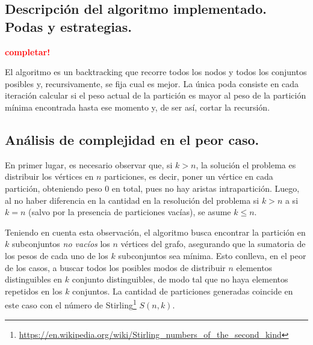 \subsection{Descripción del algoritmo implementado. Podas y estrategias.}
\vspace*{0.3cm}

\textcolor{red}{\textbf{completar!}}

El algoritmo es un backtracking que recorre todos los nodos y todos los
conjuntos posibles y, recursivamente, se fija cual es mejor.  La única poda
consiste en cada iteración calcular si el peso actual de la partición es mayor
al peso de la partición mínima encontrada hasta ese momento y, de ser así,
cortar la recursión.


\newpage

\subsection{Análisis de complejidad en el peor caso.}
\vspace*{0.3cm}

En primer lugar, es necesario observar que, si $k > n$, la solución el problema
es distribuir los vértices en $n$ particiones, es decir, poner un vértice en
cada partición, obteniendo peso $0$ en total, pues no hay aristas
intrapartición. Luego, al no haber diferencia en la cantidad en la resolución
del problema si $k > n$ a si $k = n$ (salvo por la presencia de particiones
vacías), se asume $k \le n$.

Teniendo en cuenta esta observación, el algoritmo busca encontrar la
partición en $k$ subconjuntos \textit{no vacíos} los $n$ vértices del grafo,
asegurando que la sumatoria de los pesos de cada uno de los $k$ subconjuntos
sea mínima. Esto conlleva, en el peor de los casos, a buscar todos los posibles
modos de distribuir $n$ elementos distinguibles en $k$ conjunto distinguibles,
de modo tal que no haya elementos repetidos en los $k$ conjuntos. La cantidad
de particiones generadas coincide en este caso con el número de
Stirling\footnote{
\url{https://en.wikipedia.org/wiki/Stirling_numbers_of_the_second_kind}} $S(n,
k)$.

